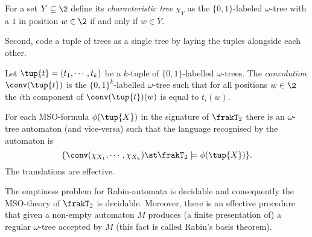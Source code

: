\begin{definition} \label{AS:dfn:chartree}
For a set $Y \subseteq \2$ define
its {\em characteristic tree} $\chi_Y$ as the $\{0,1\}$-labeled $\omega$-tree with a $1$ in position $w \in \2$ if and only if $w \in Y$.
\end{definition}

Second, code a tuple of trees as a single tree by laying the tuples alongside each other.

\begin{definition} \label{AS:dfn:convtrees}
Let $\tup{t} = (t_1,\cdots,t_k)$
be a $k$-tuple of $\{0,1\}$-labelled $\omega$-trees. 
The {\em convolution} $\conv(\tup{t})$ is the $\{0,1\}^k$-labelled $\omega$-tree such that for all positions $w \in \2$
the $i$th component of $\conv(\tup{t})(w)$ is equal to $t_i(w)$.
\end{definition} 


\begin{theorem}
For each MSO-formula $\phi(\tup{X})$ in the signature of $\frakT_2$ there is an $\omega$-tree automaton (and vice-versa) such that the language recognised by the automaton is
\[
\{\conv(\chi_{X_1},\cdots,\chi_{X_k}) \st \frakT_2 \models \phi(\tup{X})\}.
\]
The translations are effective.
\end{theorem}

\begin{proposition} \cite{Thom90}
The emptiness problem for Rabin-automata is decidable and consequently the MSO-theory of $\frakT_2$ is decidable.
Moreover, there is an effective procedure that given a non-empty automaton $M$ produces (a finite presentation of) a 
regular $\omega$-tree accepted by $M$ (this fact is called Rabin's basis theorem).
\end{proposition}

